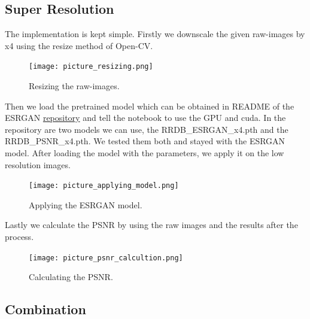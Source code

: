 \subsection{Super Resolution}

The implementation is kept simple. Firstly we downscale the given raw-images by x4 using the resize method of Open-CV.
\begin{figure}[ht!]
    \begin{center}
        \texttt{[image: picture\_resizing.png]}
        \caption{Resizing the raw-images.} \label{sr_resizing}
    \end{center}
\end{figure}

Then we load the pretrained model which can be obtained in README  of the ESRGAN \href{https://github.com/xinntao/ESRGAN}{repository} and tell the notebook to use the GPU and cuda. In the repository are two models we can use, the RRDB_ESRGAN_x4.pth and the RRDB_PSNR_x4.pth. We tested them both and stayed with the ESRGAN model. After loading the model with the parameters, we apply it on the low resolution images.
\begin{figure}[ht!]
    \begin{center}
        \texttt{[image: picture\_applying\_model.png]}
        \caption{Applying the ESRGAN model.} \label{sr_applying_model}
    \end{center}
\end{figure}

Lastly we calculate the PSNR by using the raw images and the results after the process.

\begin{figure}[ht!]
    \begin{center}
        \texttt{[image: picture\_psnr\_calcultion.png]}
        \caption{Calculating the PSNR.} \label{sr_psnr_calc}
    \end{center}
\end{figure}

\subsection{Combination}

